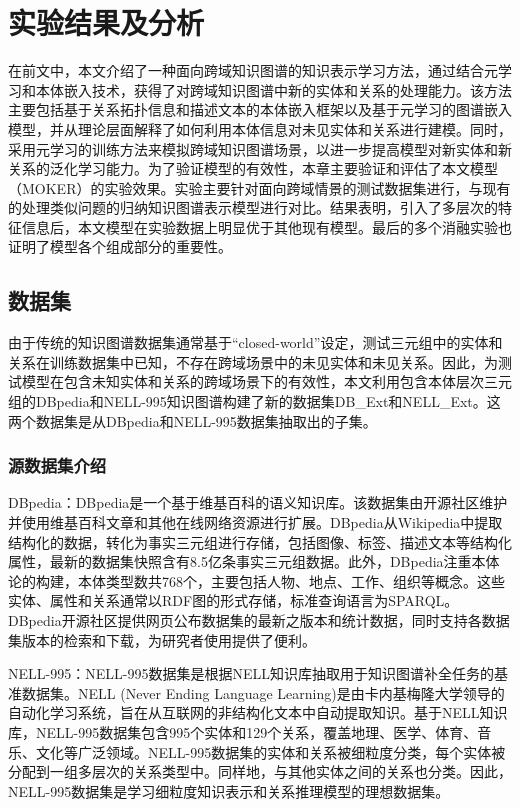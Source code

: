\chapter{实验结果及分析}
在前文中，本文介绍了一种面向跨域知识图谱的知识表示学习方法，通过结合元学习和本体嵌入技术，获得了对跨域知识图谱中新的实体和关系的处理能力。该方法主要包括基于关系拓扑信息和描述文本的本体嵌入框架以及基于元学习的图谱嵌入模型，并从理论层面解释了如何利用本体信息对未见实体和关系进行建模。同时，采用元学习的训练方法来模拟跨域知识图谱场景，以进一步提高模型对新实体和新关系的泛化学习能力。为了验证模型的有效性，本章主要验证和评估了本文模型（MOKER）的实验效果。实验主要针对面向跨域情景的测试数据集进行，与现有的处理类似问题的归纳知识图谱表示模型进行对比。结果表明，引入了多层次的特征信息后，本文模型在实验数据上明显优于其他现有模型。最后的多个消融实验也证明了模型各个组成部分的重要性。

\section{数据集}
由于传统的知识图谱数据集通常基于“closed-world”设定，测试三元组中的实体和关系在训练数据集中已知，不存在跨域场景中的未见实体和未见关系。因此，为测试模型在包含未知实体和关系的跨域场景下的有效性，本文利用包含本体层次三元组的DBpedia和NELL-995知识图谱构建了新的数据集DB\_Ext和NELL\_Ext。这两个数据集是从DBpedia和NELL-995数据集抽取出的子集。

\subsection{源数据集介绍}
DBpedia：DBpedia是一个基于维基百科的语义知识库。该数据集由开源社区维护并使用维基百科文章和其他在线网络资源进行扩展。DBpedia从Wikipedia中提取结构化的数据，转化为事实三元组进行存储，包括图像、标签、描述文本等结构化属性，最新的数据集快照含有8.5亿条事实三元组数据。此外，DBpedia注重本体论的构建，本体类型数共768个，主要包括人物、地点、工作、组织等概念。这些实体、属性和关系通常以RDF图的形式存储，标准查询语言为SPARQL。DBpedia开源社区提供网页公布数据集的最新之版本和统计数据，同时支持各数据集版本的检索和下载，为研究者使用提供了便利。

NELL-995：NELL-995数据集是根据NELL知识库抽取用于知识图谱补全任务的基准数据集。NELL (Never Ending Language Learning)是由卡内基梅隆大学领导的自动化学习系统，旨在从互联网的非结构化文本中自动提取知识。基于NELL知识库，NELL-995数据集包含995个实体和129个关系，覆盖地理、医学、体育、音乐、文化等广泛领域。NELL-995数据集的实体和关系被细粒度分类，每个实体被分配到一组多层次的关系类型中。同样地，与其他实体之间的关系也分类。因此，NELL-995数据集是学习细粒度知识表示和关系推理模型的理想数据集。

